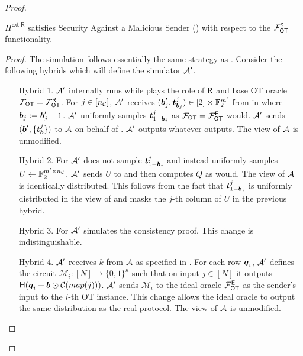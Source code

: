 
\begin{proof}\label{proof:ext_R_S}
		\begin{claim}\label{claim:ext-R-S-MalSender}
		$\Pi^{\textsf{ext-R}}$ satisfies Security Against a Malicious Sender () with respect to the $\mathcal{F}_{\mathsf{OT}}^\mathsf{S}$ functionality.
	\end{claim}
	\begin{proof}
		
		The simulation follows essentially the same strategy as . Consider the following hybrids which will define the simulator $\mathcal{A}'$. 
		\begin{enumerate}[leftmargin=1.8cm]
			\item[Hybrid 1.] $\mathcal{A}'$ internally runs \Adv while plays the role of $\mathsf{R}$ and base OT oracle $\mathcal{F}_{\mathsf{OT}}=\mathcal{F}_{\mathsf{OT}}^\mathsf{R}$. For $j\in[{n_\mathcal{C}}]$, $\mathcal{A}'$ receives $(\boldsymbol{b}'_j,\boldsymbol{t}^j_{\boldsymbol{b}_j})\in [2]\times \mathbb{F}^{m'}_2$ from \Adv in  where $\boldsymbol{b}_j:=\boldsymbol{b}_j'-1$. $\mathcal{A}'$ uniformly samples $\boldsymbol{t}^j_{1-\boldsymbol{b}_j}$ as $\mathcal{F}_{\mathsf{OT}}=\mathcal{F}_{\mathsf{OT}}^\mathsf{E}$ would. $\mathcal{A}'$ sends $(\boldsymbol{b}', \{\boldsymbol{t}^j_{\boldsymbol{b}}\})$ to $\mathcal{A}$ on behalf of \OOT. $\mathcal{A}'$ outputs whatever \Adv outputs. The view of $\mathcal{A}$ is unmodified.
			
			\item[Hybrid 2.] For  $\mathcal{A}'$ does not sample $\boldsymbol{t}^j_{1-\boldsymbol{b}_j}$ and instead uniformly samples $U\gets\mathbb{F}^{m'\times {n_\mathcal{C}}}_2$. $\mathcal{A}'$ sends $U$ to \Adv and then computes $Q$ as \send would. The view of $\mathcal{A}$ is identically distributed. This follows from the fact that $\boldsymbol{t}^j_{1-\boldsymbol{b}_j}$ is uniformly distributed in the view of \Adv and masks the $j$-th column of $U$ in the previous hybrid. 
			
			\item[Hybrid 3.] For  $\mathcal{A}'$ simulates the consistency proof. This change is indistinguishable. 
			
			\item[Hybrid 4.]\label{hybrid:mmmm} $\mathcal{A}'$ receives $k$ from $\mathcal{A}$ as specified in . For each row $\boldsymbol{q}_i$, $\mathcal{A}'$ defines the circuit $\mathcal{M}_i:[N]\rightarrow\{0,1\}^\kappa$ such that on input $j\in[N]$ it outputs $\mathsf{H}( \boldsymbol{q}_i+\boldsymbol{b}\odot \mathcal{C}(map(j)))$. $\mathcal{A}'$ sends $\mathcal{M}_i$ to the ideal oracle $\mathcal{F}_{\mathsf{OT}}^\mathsf{E}$ as the sender's input to the $i$-th OT instance. This change allows the ideal oracle to output the same distribution as the real protocol. The view of $\mathcal{A}$ is unmodified.
			

\end{enumerate}
\end{proof}
\end{proof}

